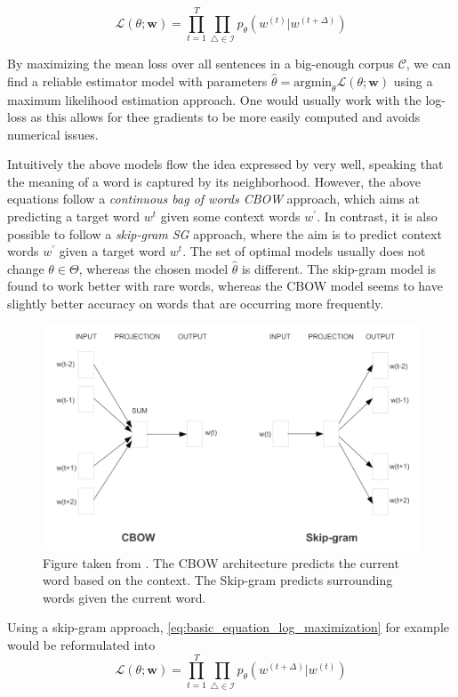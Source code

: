 \documentclass[a4paper,12pt,twoside,openright]{report}
\begin{document}
\begin{equation}
\mathcal{L}(\theta ; \mathbf{w})= \prod_{t=1}^{T} \prod_{\triangle \in \mathcal{I}} p_{\theta}\left(w^{(t)} | w^{(t +\Delta)}\right)
\end{equation}{\label{eq:basic_equation_log_maximization}}

By maximizing the mean loss over all sentences in a big-enough corpus $\mathcal{C}$, we can find a reliable estimator model with parameters $\hat{\theta} = \text{argmin}_\theta \mathcal{L}(\theta ; \mathbf{w})$ using a maximum likelihood estimation approach.
One would usually work with the log-loss as this allows for thee gradients to be more easily computed and avoids numerical issues.

Intuitively the above models flow the idea expressed by \cite{harris54} very well, speaking that the meaning of a word is captured by its neighborhood.
However, the above equations follow a \textit{continuous bag of words CBOW} approach, which aims at predicting a target word $w^t$ given some context words $w^{\prime}$.
In contrast, it is also possible to follow a \textit{skip-gram SG} approach, where the aim is to predict context words $w^{\prime}$ given a target word $w^t$.
The set of optimal models usually does not change $\theta \in \Theta$, whereas the chosen model $\hat{\theta}$ is different.
The skip-gram model is found to work better with rare words, whereas the CBOW model seems to have slightly better accuracy on words that are occurring more frequently.

\begin{figure}[h]
	\center
  \includegraphics[width=0.6\linewidth]{./assets/background/cbow_and_skipgram.png}
  \caption{Figure taken from \cite{mikolov13}. The CBOW architecture predicts the current word based on the context. The Skip-gram predicts surrounding words given the current word.}
  \label{fig:cbow_skipgram}
\end{figure}

Using a skip-gram approach, \eqref{eq:basic_equation_log_maximization} for example would be reformulated into 
\begin{equation}
\mathcal{L}(\theta ; \mathbf{w})=\prod_{t=1}^{T} \prod_{\triangle \in \mathcal{I}} p_{\theta}\left(w^{(t +\Delta)} | w^{(t)}\right)
\end{equation}{\label{eq:basic_equation_log_maximization_skipgram}}
\end{document}
